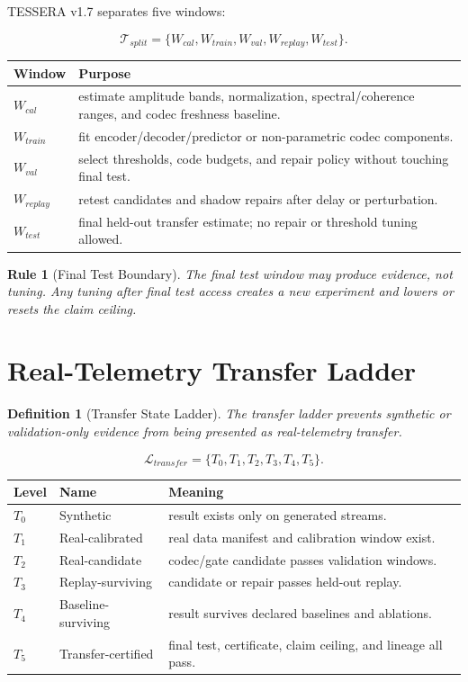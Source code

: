 \documentclass[12pt]{article}
\newtheorem{definition}{Definition}
\newtheorem{rulebox}{Rule}
\begin{document}
TESSERA v1.7 separates five windows:

\[
\mathcal{T}_{split}=\{W_{cal},W_{train},W_{val},W_{replay},W_{test}\}.
\]

\begin{longtable}{p{}p{}}
\toprule
\textbf{Window} & \textbf{Purpose} \\
\midrule
$W_{cal}$ & estimate amplitude bands, normalization, spectral/coherence ranges, and codec freshness baseline. \\
$W_{train}$ & fit encoder/decoder/predictor or non-parametric codec components. \\
$W_{val}$ & select thresholds, code budgets, and repair policy without touching final test. \\
$W_{replay}$ & retest candidates and shadow repairs after delay or perturbation. \\
$W_{test}$ & final held-out transfer estimate; no repair or threshold tuning allowed. \\
\bottomrule
\end{longtable}

\begin{rulebox}[Final Test Boundary]
The final test window may produce evidence, not tuning. Any tuning after final
test access creates a new experiment and lowers or resets the claim ceiling.
\end{rulebox}

\section{Real-Telemetry Transfer Ladder}

\begin{definition}[Transfer State Ladder]
The transfer ladder prevents synthetic or validation-only evidence from being
presented as real-telemetry transfer.
\end{definition}

\[
\mathcal{L}_{transfer}=\{T_0,T_1,T_2,T_3,T_4,T_5\}.
\]

\begin{longtable}{p{}p{}p{}}
\toprule
\textbf{Level} & \textbf{Name} & \textbf{Meaning} \\
\midrule
$T_0$ & Synthetic & result exists only on generated streams. \\
$T_1$ & Real-calibrated & real data manifest and calibration window exist. \\
$T_2$ & Real-candidate & codec/gate candidate passes validation windows. \\
$T_3$ & Replay-surviving & candidate or repair passes held-out replay. \\
$T_4$ & Baseline-surviving & result survives declared baselines and ablations. \\
$T_5$ & Transfer-certified & final test, certificate, claim ceiling, and lineage all pass. \\
\bottomrule
\end{longtable}
\end{document}
